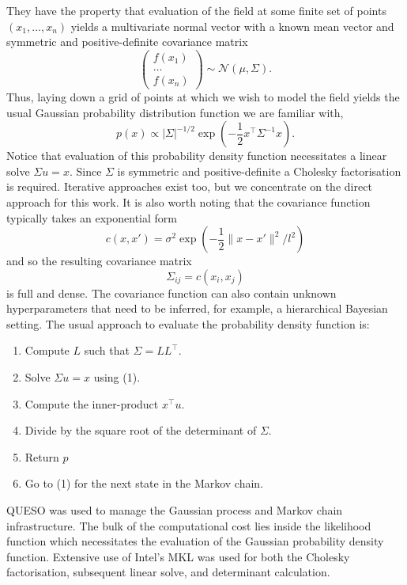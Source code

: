 They have the property that evaluation of the field at some finite set of
points $(x_1, \ldots, x_n)$ yields a multivariate normal vector with a known
mean vector and symmetric and positive-definite covariance matrix
\begin{equation}
  \begin{pmatrix}
    f(x_1) \\
    \hdots \\
    f(x_n)
  \end{pmatrix}
  \sim \mathcal{N}(\mu, \Sigma).
\end{equation}
Thus, laying down a grid of points at which we wish to model the field yields
the usual Gaussian probability distribution function we are familiar with,
\begin{equation}
  p(x) \propto |\Sigma|^{-1/2} \exp(-\frac12 x^\top \Sigma^{-1} x).
\end{equation}
Notice that evaluation of this probability density function necessitates a
linear solve $\Sigma u = x$.  Since $\Sigma$ is symmetric and positive-definite
a Cholesky factorisation is required.  Iterative approaches exist too, but we
concentrate on the direct approach for this work.  It is also worth noting that the
covariance function typically takes an exponential form
\begin{equation}
  c(x, x') = \sigma^2 \exp(-\frac12 \| x - x' \|^2 / l^2)
\end{equation}
and so the resulting covariance matrix
\begin{equation}
  \Sigma_{ij} = c(x_i, x_j)
\end{equation}
is full and dense.  The covariance function can also contain
unknown hyperparameters
that need to be inferred, for example, a hierarchical
Bayesian setting.  The usual approach to evaluate the
probability density function is: 
\begin{enumerate}
  \item Compute $L$ such that $\Sigma = LL^\top$.
  \item Solve $\Sigma u = x$ using (1).
  \item Compute the inner-product $x^\top u$.
  \item Divide by the square root of the determinant of $\Sigma$.
  \item Return $p$
  \item Go to (1) for the next state in the Markov chain.
\end{enumerate}

QUESO was used to manage the Gaussian process and Markov chain infrastructure.
The bulk of the computational cost lies inside the likelihood function which
necessitates the evaluation of the Gaussian probability density function.
Extensive use of Intel's MKL was used for both the Cholesky factorisation,
subsequent linear solve, and determinant calculation.

